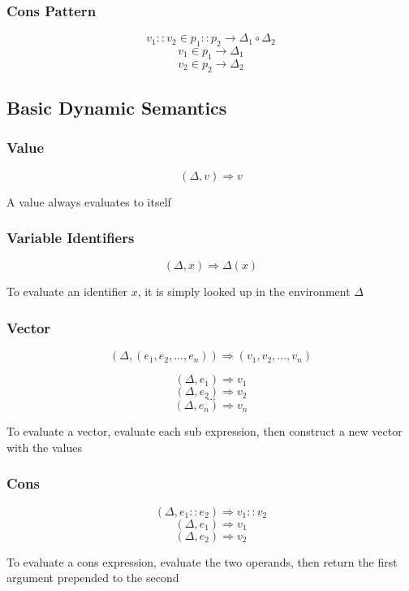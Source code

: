 \documentclass[titlepage]{article}
\begin{document}
\subsubsection{Cons Pattern}


$$v_1 :: v_2 \in p_1 :: p_2 \rightarrow \Delta_1 \circ \Delta_2$$
\noindent\makebox[\linewidth]{\rule{2in}{0.4pt}}
$$v_1 \in p_1 \rightarrow \Delta_1$$
$$v_2 \in p_2 \rightarrow \Delta_2$$

\subsection{Basic Dynamic Semantics}

\subsubsection{Value}

$$(\Delta, v) \Rightarrow v$$

A value always evaluates to itself

\subsubsection{Variable Identifiers}
$$(\Delta, x) \Rightarrow \Delta (x)$$

To evaluate an identifier $x$, it is simply looked up in the environment $\Delta$

\subsubsection{Vector}

$$(\Delta, (e_1, e_2, ..., e_n)) \Rightarrow (v_1, v_2, ..., v_n)$$

\noindent\makebox[\linewidth]{\rule{2.1in}{0.4pt}}
$$(\Delta, e_1) \Rightarrow v_1$$
$$(\Delta, e_2) \Rightarrow v_2$$
$$\dots$$
$$(\Delta, e_n) \Rightarrow v_n$$


To evaluate a vector, evaluate each sub expression, then construct a new vector with the values

\subsubsection{Cons}

$$(\Delta, e_1 :: e_2) \Rightarrow v_1 :: v_2$$
\noindent\makebox[\linewidth]{\rule{1.4in}{0.4pt}}
$$(\Delta, e_1) \Rightarrow v_1$$
$$(\Delta, e_2) \Rightarrow v_2$$

To evaluate a cons expression, evaluate the two operands, then return the first argument prepended to the second
\end{document}
